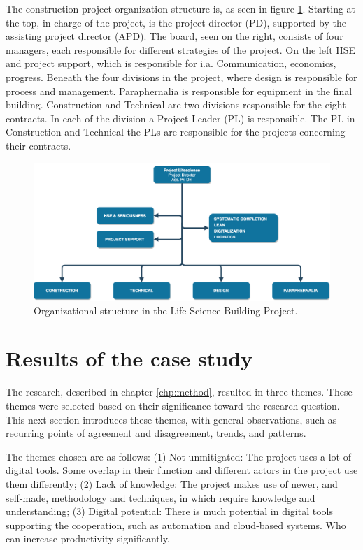 The construction project organization structure is, as seen in figure \ref{fig:project_structure}. Starting at the top, in charge of the project, is the project director (PD), supported by the assisting project director (APD). The board, seen on the right, consists of four managers, each responsible for different strategies of the project. On the left HSE and project support, which is responsible for i.a. Communication, economics, progress. Beneath the four divisions in the project, where design is responsible for process and management. Paraphernalia is responsible for equipment in the final building. Construction and Technical are two divisions responsible for the eight contracts. In each of the division a Project Leader (PL) is responsible. The PL in Construction and Technical the PLs are responsible for the projects concerning their contracts.

\begin{figure}
    \centering
    \includegraphics[width=\textwidth]{fig/lvb_diagram.png}
    \caption{Organizational structure in the Life Science Building Project.}
    \label{fig:project_structure}
\end{figure}

\section{Results of the case study}
The research, described in chapter \ref{chp:method}, resulted in three themes. These themes were selected based on their significance toward the research question. This next section introduces these themes, with general observations, such as recurring points of agreement and disagreement, trends, and patterns. 

The themes chosen are as follows: (1) Not unmitigated: The project uses a lot of digital tools. Some overlap in their function and different actors in the project use them differently; (2) Lack of knowledge: The project makes use of newer, and self-made, methodology and techniques, in which require knowledge and understanding; (3) Digital potential: There is much potential in digital tools supporting the cooperation, such as automation and cloud-based systems. Who can increase productivity significantly.


